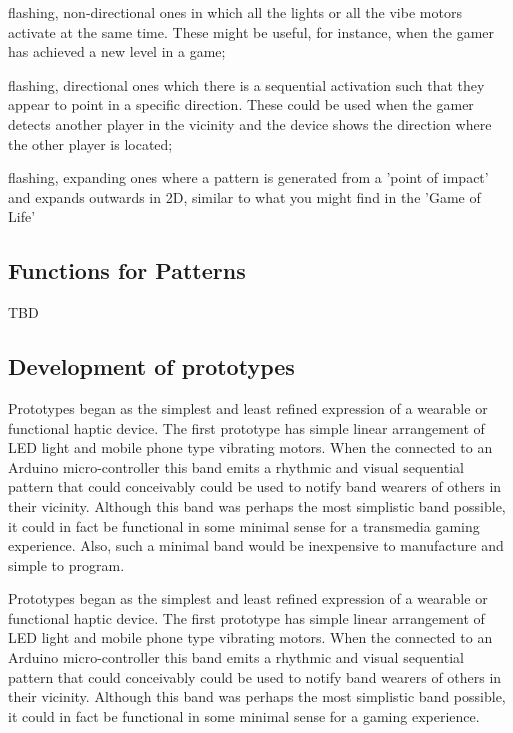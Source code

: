 \documentclass{chi-ext}
\begin{document}
\begin{inparaenum}
\item flashing, non-directional ones in which all the lights or all the vibe motors activate at the same time. These might be useful, for instance, when the gamer has achieved a new level in a game;
\item flashing, directional ones which there is a sequential activation such that they appear to point in a specific direction. These could be used when the gamer detects another player in the vicinity and the device shows the direction where the other player is located;
\item flashing, expanding ones where a pattern is generated from a 'point of impact' and expands outwards in 2D, similar to what you might find in the 'Game of Life'
\end{inparaenum}

\subsection{Functions for Patterns}
TBD

\subsection{Development of prototypes}
Prototypes began as the simplest and least refined expression of a wearable or functional haptic device. The first prototype has simple linear arrangement of LED light and mobile phone type vibrating motors. When the connected to an Arduino micro-controller this band emits a rhythmic and visual sequential pattern that could conceivably could be used to notify band wearers of others in their vicinity. Although this band was perhaps the most simplistic band possible, it could in fact be functional in some minimal sense for a transmedia gaming experience. Also, such a minimal band would be inexpensive to manufacture and simple to program. 

Prototypes began as the simplest and least refined expression of a wearable or functional haptic device. The first prototype has simple linear arrangement of LED light and mobile phone type vibrating motors. When the connected to an Arduino micro-controller this band emits a rhythmic and visual sequential pattern that could conceivably could be used to notify band wearers of others in their vicinity. Although this band was perhaps the most simplistic band possible, it could in fact be functional in some minimal sense for a gaming experience. 
\end{document}
